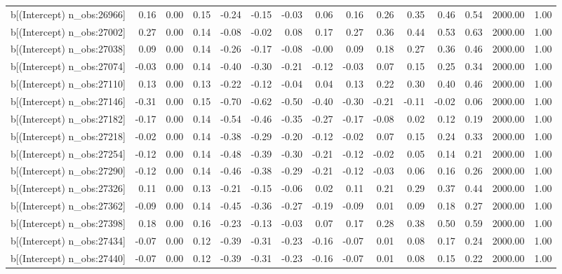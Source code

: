 \begin{table}[ht]
\begin{tabular}{rrrrrrrrrrrrrrr}
  b[(Intercept) n\_obs:26966] & 0.16 & 0.00 & 0.15 & -0.24 & -0.15 & -0.03 & 0.06 & 0.16 & 0.26 & 0.35 & 0.46 & 0.54 & 2000.00 & 1.00 \\ 
  b[(Intercept) n\_obs:27002] & 0.27 & 0.00 & 0.14 & -0.08 & -0.02 & 0.08 & 0.17 & 0.27 & 0.36 & 0.44 & 0.53 & 0.63 & 2000.00 & 1.00 \\ 
  b[(Intercept) n\_obs:27038] & 0.09 & 0.00 & 0.14 & -0.26 & -0.17 & -0.08 & -0.00 & 0.09 & 0.18 & 0.27 & 0.36 & 0.46 & 2000.00 & 1.00 \\ 
  b[(Intercept) n\_obs:27074] & -0.03 & 0.00 & 0.14 & -0.40 & -0.30 & -0.21 & -0.12 & -0.03 & 0.07 & 0.15 & 0.25 & 0.34 & 2000.00 & 1.00 \\ 
  b[(Intercept) n\_obs:27110] & 0.13 & 0.00 & 0.13 & -0.22 & -0.12 & -0.04 & 0.04 & 0.13 & 0.22 & 0.30 & 0.40 & 0.46 & 2000.00 & 1.00 \\ 
  b[(Intercept) n\_obs:27146] & -0.31 & 0.00 & 0.15 & -0.70 & -0.62 & -0.50 & -0.40 & -0.30 & -0.21 & -0.11 & -0.02 & 0.06 & 2000.00 & 1.00 \\ 
  b[(Intercept) n\_obs:27182] & -0.17 & 0.00 & 0.14 & -0.54 & -0.46 & -0.35 & -0.27 & -0.17 & -0.08 & 0.02 & 0.12 & 0.19 & 2000.00 & 1.00 \\ 
  b[(Intercept) n\_obs:27218] & -0.02 & 0.00 & 0.14 & -0.38 & -0.29 & -0.20 & -0.12 & -0.02 & 0.07 & 0.15 & 0.24 & 0.33 & 2000.00 & 1.00 \\ 
  b[(Intercept) n\_obs:27254] & -0.12 & 0.00 & 0.14 & -0.48 & -0.39 & -0.30 & -0.21 & -0.12 & -0.02 & 0.05 & 0.14 & 0.21 & 2000.00 & 1.00 \\ 
  b[(Intercept) n\_obs:27290] & -0.12 & 0.00 & 0.14 & -0.46 & -0.38 & -0.29 & -0.21 & -0.12 & -0.03 & 0.06 & 0.16 & 0.26 & 2000.00 & 1.00 \\ 
  b[(Intercept) n\_obs:27326] & 0.11 & 0.00 & 0.13 & -0.21 & -0.15 & -0.06 & 0.02 & 0.11 & 0.21 & 0.29 & 0.37 & 0.44 & 2000.00 & 1.00 \\ 
  b[(Intercept) n\_obs:27362] & -0.09 & 0.00 & 0.14 & -0.45 & -0.36 & -0.27 & -0.19 & -0.09 & 0.01 & 0.09 & 0.18 & 0.27 & 2000.00 & 1.00 \\ 
  b[(Intercept) n\_obs:27398] & 0.18 & 0.00 & 0.16 & -0.23 & -0.13 & -0.03 & 0.07 & 0.17 & 0.28 & 0.38 & 0.50 & 0.59 & 2000.00 & 1.00 \\ 
  b[(Intercept) n\_obs:27434] & -0.07 & 0.00 & 0.12 & -0.39 & -0.31 & -0.23 & -0.16 & -0.07 & 0.01 & 0.08 & 0.17 & 0.24 & 2000.00 & 1.00 \\ 
  b[(Intercept) n\_obs:27440] & -0.07 & 0.00 & 0.12 & -0.39 & -0.31 & -0.23 & -0.16 & -0.07 & 0.01 & 0.08 & 0.15 & 0.22 & 2000.00 & 1.00 \\ 

\end{tabular}
\end{table}
